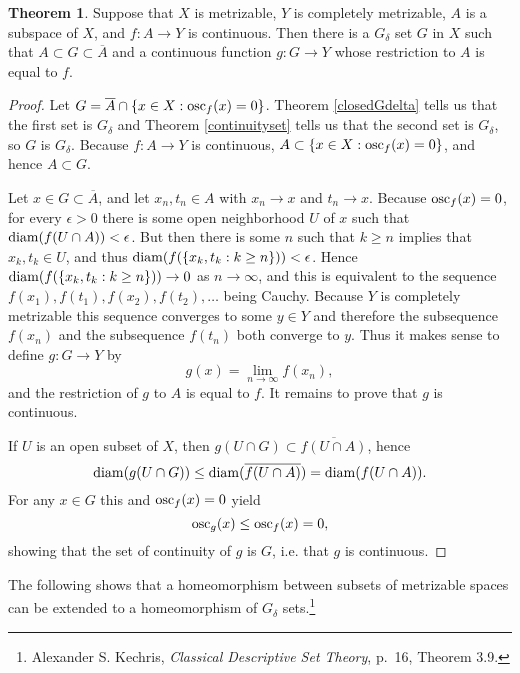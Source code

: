 \documentclass{article}
\newcommand{\diam}{\ensuremath\mathrm{diam}}
\newcommand{\osc}{\ensuremath\mathrm{osc}}
\theoremstyle{definition}
\newtheorem{theorem}{Theorem}
\theoremstyle{definition}
\begin{document}
\begin{theorem}
Suppose that $X$ is metrizable, $Y$ is completely metrizable, $A$ is a subspace of $X$, and $f:A \to Y$ is continuous. Then there is a $G_\delta$ set
$G$ in $X$ such that $A \subset G \subset \overline{A}$ and a continuous function $g:G \to Y$ whose restriction to $A$ is equal to $f$.
\label{kuratowski}
\end{theorem}
\begin{proof}
Let $G=\overline{A} \cap \{x \in X: \osc_f(x)=0\}$.
Theorem \ref{closedGdelta} tells us that the first set is $G_\delta$ and 
Theorem \ref{continuityset} tells us that the second set is $G_\delta$, so $G$ is $G_\delta$. Because $f:A \to Y$ is continuous,
$A \subset \{x \in X: \osc_f(x)=0\}$, and hence $A \subset G$.

Let $x \in G \subset \overline{A}$, and let $x_n, t_n \in A$ with $x_n \to x$ and $t_n \to x$. Because $\osc_f(x)=0$, 
for every $\epsilon>0$ there is some open neighborhood $U$ of $x$ such that 
$\diam(f(U \cap A))<\epsilon$. But then there is some $n$ such that $k \geq n$ implies that $x_k, t_k \in U$, and thus
$\diam(f(\{x_k,t_k: k \geq n\}))<\epsilon$. Hence
$\diam(f(\{x_k,t_k: k \geq n\})) \to 0$ as $n \to \infty$, and
this is equivalent to the sequence $f(x_1),f(t_1),f(x_2),f(t_2),\ldots$ being Cauchy. Because $Y$ is completely metrizable this sequence converges to some
$y \in Y$
and therefore the subsequence $f(x_n)$ and the subsequence $f(t_n)$ both converge to $y$.
Thus it makes sense to define $g:G \to Y$ by
\[
g(x) = \lim_{n \to \infty} f(x_n),
\]
and the restriction of $g$ to $A$ is equal to $f$.  It remains to prove that $g$ is continuous.

If $U$ is an open subset of $X$, then $g(U \cap G) \subset \overline{f(U \cap A)}$, hence
\[
\diam( g(U \cap G)) \leq \diam(\overline{f(U \cap A)}) = \diam(f(U \cap A)).
\]
For any $x \in G$ this and $\osc_f(x)=0$ yield
\[
\osc_g(x) \leq \osc_f(x) = 0,
\]
showing that the set of continuity of $g$ is $G$, i.e. that $g$ is continuous.
\end{proof}

The following shows that a homeomorphism between  subsets of metrizable spaces can be extended to a homeomorphism of
 $G_\delta$ sets.\footnote{Alexander S. Kechris, {\em Classical Descriptive Set Theory}, p.~16, Theorem 3.9.}
\end{document}
